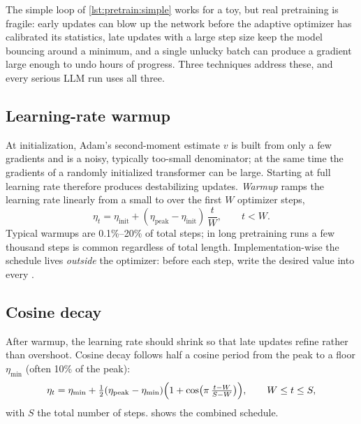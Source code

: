 The simple loop of \cref{lst:pretrain:simple} works for a toy, but real pretraining is
fragile: early updates can blow up the network before the adaptive optimizer has calibrated its
statistics, late updates with a large step size keep the model bouncing around a minimum, and a
single unlucky batch can produce a gradient large enough to undo hours of progress. Three
techniques address these, and every serious LLM run uses all three.

\subsection{Learning-rate warmup}\label{sec:pretrain:warmup}

At initialization, Adam's second-moment estimate $v$ is built from only a few gradients and is a
noisy, typically too-small denominator; at the same time the gradients of a randomly
initialized transformer can be large. Starting at full learning rate therefore produces
destabilizing updates. \emph{Warmup} ramps the learning rate linearly from a small
 to  over the first $W$ optimizer steps,
\begin{equation}
\eta_t = \eta_{\text{init}} + (\eta_{\text{peak}}-\eta_{\text{init}})\,\frac{t}{W}, \qquad t<W.
\end{equation}
Typical warmups are 0.1\%--20\% of total steps; in long pretraining runs a few thousand steps
is common regardless of total length. Implementation-wise the schedule lives \emph{outside}
the optimizer: before each step, write the desired value into every
.

\subsection{Cosine decay}\label{sec:pretrain:cosine}

After warmup, the learning rate should shrink so that late updates refine rather than
overshoot. Cosine decay follows half a cosine period from the peak to a floor
$\eta_{\min}$ (often 10\% of the peak):
\begin{equation}
\eta_t = \eta_{\min} + \tfrac12(\eta_{\text{peak}}-\eta_{\min})
  \Bigl(1+\cos\bigl(\pi\,\tfrac{t-W}{S-W}\bigr)\Bigr), \qquad W\le t\le S,
\label{eq:pretrain:cosine}
\end{equation}
with $S$ the total number of steps.  shows the combined schedule.

